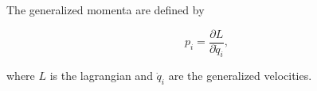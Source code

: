 The generalized momenta are defined by

$$p_i = \frac{\partial L}{\partial \dot{q}_i},$$

where $L$ is the lagrangian and $\dot{q}_i$ are the generalized velocities.
